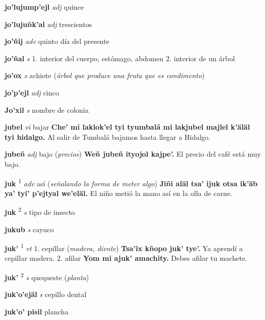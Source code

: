 \documentclass[10pt]{scrbook}
\newcommand{\entry}[1]{\textbf{#1}}
\newcommand{\onedefinition}[1]{#1.}
\newcommand{\defsuperscript}[1]{\textsuperscript{#1}}
\newcommand{\partofspeech}[1]{\textit{#1}}
\newcommand{\spanishtranslation}[1]{#1}
\newcommand{\clarification}[1]{(\textit{#1})}
\newcommand{\cholexample}[1]{\textbf{#1}}
\newcommand{\exampletranslation}[1]{#1}
\begin{document}
\begin{multicols}{2}
\entry{jo'lujump'ejl}
\partofspeech{adj}
\spanishtranslation{quince}

\entry{jo'lujuñk'al}
\partofspeech{adj}
\spanishtranslation{trescientos}

\entry{jo'ñij}
\partofspeech{adv}
\spanishtranslation{quinto día del presente}

\entry{jo'ñal}
\partofspeech{s}
\onedefinition{1}
\spanishtranslation{interior del cuerpo, estómago, abdomen}
\onedefinition{2}
\spanishtranslation{interior de un árbol}

\entry{jo'ox}
\partofspeech{s}
\spanishtranslation{achiote}
\clarification{árbol que produce una fruta que es condimento}

\entry{jo'p'ejl}
\partofspeech{adj}
\spanishtranslation{cinco}

\entry{Jo'xil}
\partofspeech{s}
\spanishtranslation{nombre de colonia}

\entry{jubel}
\partofspeech{vi}
\spanishtranslation{bajar}
\cholexample{Che' mi laklok'el tyi tyumbalá mi lakjubel majlel k'äläl tyi hidalgo.}
\exampletranslation{Al salir de Tumbalá bajamos hasta llegar a Hidalgo.}

\entry{jubeñ}
\partofspeech{adj}
\spanishtranslation{bajo}
\clarification{precios}
\cholexample{Weñ jubeñ ityojol kajpe'.}
\exampletranslation{El precio del café está muy bajo.}

\entry{juk}
\defsuperscript{1}
\partofspeech{adv}
\spanishtranslation{así}
\clarification{señalando la forma de meter algo}
\cholexample{Jiñi aläl tsa' ijuk otsa ik'äb ya' tyi' p'ejtyal we'eläl.}
\exampletranslation{El niño metió la mano así en la olla de carne.}

\entry{juk}
\defsuperscript{2}
\partofspeech{s}
\spanishtranslation{tipo de insecto}

\entry{jukub}
\partofspeech{s}
\spanishtranslation{cayuco}

\entry{juk'}
\defsuperscript{1}
\partofspeech{vt}
\onedefinition{1}
\spanishtranslation{cepillar}
\clarification{madera, diente}
\cholexample{Tsa'ix kñopo juk' tye'.}
\exampletranslation{Ya aprendí a cepillar madera.}
\onedefinition{2}
\spanishtranslation{afilar}
\cholexample{Yom mi ajuk' amachity.}
\exampletranslation{Debes afilar tu machete.}

\entry{juk'}
\defsuperscript{2}
\partofspeech{s}
\spanishtranslation{quequeste}
\clarification{planta}

\entry{juk'o'ejäl}
\partofspeech{s}
\spanishtranslation{cepillo dental}

\entry{juk'o' pisil}
\spanishtranslation{plancha}


\end{multicols}
\end{document}
